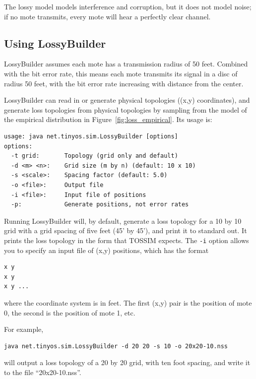 \documentclass[10pt,fleqn]{article}
\def\sim{TOSSIM\xspace}
\begin{document}
The lossy model models interference and corruption, but it does not
model noise; if no mote transmits, every mote will hear a perfectly
clear channel.

\subsection{Using LossyBuilder}

LossyBuilder assumes each mote has a transmission radius of 50
feet. Combined with the bit error rate, this means each mote transmits
its signal in a disc of radius 50 feet, with the bit error rate
increasing with distance from the center.

LossyBuilder can read in or generate physical topologies ((x,y)
coordinates), and generate loss topologies from physical topologies by
sampling from the model of the empirical distribution in
Figure~\ref{fig:loss_empirical}. Its usage is:

\begin{verbatim}
usage: java net.tinyos.sim.LossyBuilder [options]
options:
  -t grid:       Topology (grid only and default)
  -d <m> <n>:    Grid size (m by n) (default: 10 x 10)
  -s <scale>:    Spacing factor (default: 5.0)
  -o <file>:     Output file
  -i <file>:     Input file of positions
  -p:            Generate positions, not error rates
\end{verbatim}

Running LossyBuilder will, by default, generate a loss topology for a
10 by 10 grid with a grid spacing of five feet (45' by 45'), and print
it to standard out. It prints the loss topology in the form that \sim
expects. The {\tt -i} option allows you to specify an input file of
(x,y) positions, which has the format

\begin{verbatim}
x y
x y
x y ...
\end{verbatim}

\noindent where the coordinate system is in feet. The first (x,y) pair
is the position of mote 0, the second is the position of mote 1,
etc.

For example,

\begin{verbatim}
java net.tinyos.sim.LossyBuilder -d 20 20 -s 10 -o 20x20-10.nss
\end{verbatim}

\noindent will output a loss topology of a 20 by 20 grid, with
ten foot spacing, and write it to the file ``20x20-10.nss''.
\end{document}
